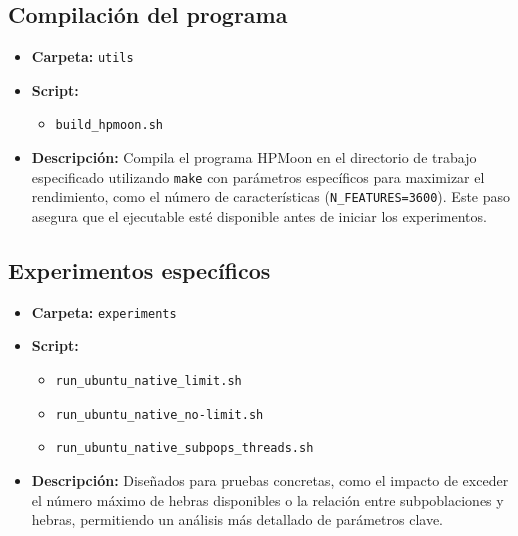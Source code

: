 \subsection{Compilación del programa}
\begin{itemize}
    \item \textbf{Carpeta:} \texttt{utils}
    \item \textbf{Script:}
          \begin{itemize}
              \item \texttt{build\_hpmoon.sh}
          \end{itemize}
    \item \textbf{Descripción:} Compila el programa HPMoon en el directorio de trabajo especificado utilizando \texttt{make} con parámetros específicos para maximizar el rendimiento, como el número de características (\texttt{N\_FEATURES=3600}). Este paso asegura que el ejecutable esté disponible antes de iniciar los experimentos.
\end{itemize}

\subsection{Experimentos específicos}
\begin{itemize}
    \item \textbf{Carpeta:} \texttt{experiments}
    \item \textbf{Script:}
          \begin{itemize}
              \item \texttt{run\_ubuntu\_native\_limit.sh}
              \item \texttt{run\_ubuntu\_native\_no-limit.sh}
              \item \texttt{run\_ubuntu\_native\_subpops\_threads.sh}
          \end{itemize}
    \item \textbf{Descripción:} Diseñados para pruebas concretas, como el impacto de exceder el número máximo de hebras disponibles o la relación entre subpoblaciones y hebras, permitiendo un análisis más detallado de parámetros clave.
\end{itemize}

